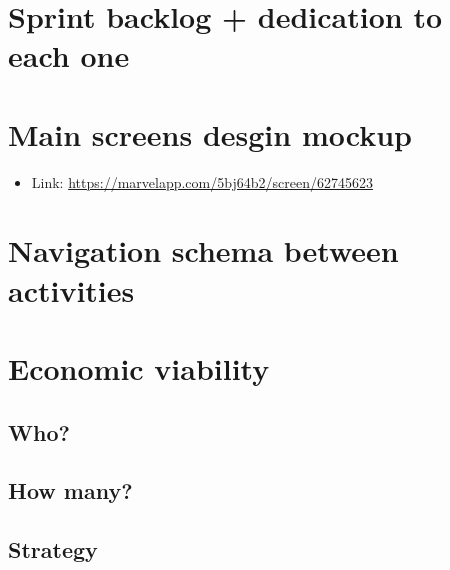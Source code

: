 \documentclass[11pt,a4paper]{article}
\begin{document}
\newpage

\section{Sprint backlog + dedication to each one}

\section{Main screens desgin mockup}
\begin{itemize}
\item Link: \url{https://marvelapp.com/5bj64b2/screen/62745623}
\end{itemize}

\newpage

\section{Navigation schema between activities}

\section{Economic viability}
\subsection{Who?}

\subsection{How many?}
	
\subsection{Strategy}
\end{document}
